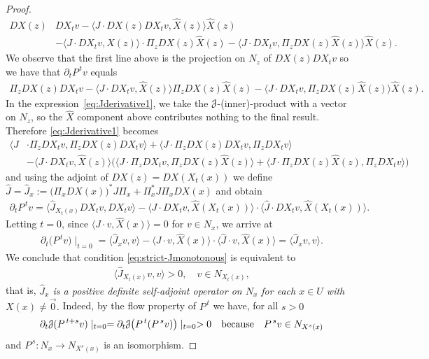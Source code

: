 \documentclass[12pt,reqno]{amsart}
\numberwithin{equation}{section}
\theoremstyle{plain}
\theoremstyle{definition}
\newcommand{\J}{\EuScript{J}}
\begin{document}
\begin{proof}
\begin{align*}
    DX(z)&DX_tv - \langle J \cdot DX(z)DX_tv, \hat
    X(z)\rangle \hat X(z)
    \\
    &- \langle J \cdot DX_tv, \hat X(z)\rangle \cdot
    \Pi_zDX(z)\hat X(z) - \langle J \cdot DX_tv,
    \Pi_zDX(z)\hat X(z) \rangle \hat X(z).
  \end{align*}
  We observe that the first line above is the projection on
  $N_z$ of $DX(z)DX_tv$ so we have that $\partial_tP^{\,
    t}v$ equals
  \begin{align*}
     \Pi_zDX(z)DX_tv - \langle J \cdot
    DX_tv, \hat X(z)\rangle \Pi_zDX(z)\hat X(z) - \langle J
    \cdot DX_tv, \Pi_zDX(z)\hat X(z) \rangle \hat X(z).
  \end{align*}
  In the expression~\eqref{eq:Jderivative1}, we take the
  $\J$-(inner)-product with a vector on $N_z$, so the $\hat
  X$ component above contributes nothing to the final
  result. Therefore \eqref{eq:Jderivative1} becomes
  \begin{align*}
    \langle J &\cdot \Pi_{z}DX_tv , \Pi_zDX(z)DX_tv \rangle
    + \langle J \cdot \Pi_zDX(z)DX_tv , \Pi_{z}DX_tv \rangle
    \\
    &-\langle J \cdot DX_tv, \hat X(z)\rangle \big( \langle
    J \cdot \Pi_{z}DX_tv , \Pi_zDX(z)\hat X(z) \rangle +
    \langle J \cdot \Pi_zDX(z)\hat X(z) , \Pi_{z}DX_tv
    \rangle \big)
  \end{align*}
  and using the adjoint of $DX(z)=DX(X_t(x))$ we define
  $\hat J = \hat J_x := \big(\Pi_x DX(x)\big)^* J \Pi_x +
  \Pi_x^* J \Pi_x DX(x)$ and obtain
  \begin{align*}
    \partial_tP^{\, t}v = \langle \hat J_{X_t(x)} DX_tv,
    DX_tv\rangle - \langle J \cdot DX_tv, \hat
    X(X_t(x))\rangle\cdot \langle \hat J \cdot DX_tv ,\hat
    X(X_t(x)) \rangle.
  \end{align*}
  Letting $t=0$, since $ \langle J \cdot v, \hat
  X(x)\rangle=0$ for $v\in N_x$, we arrive at
  \begin{align}
    \label{eq:LPF-J-derivative}
    \partial_t\big(P^{\, t}v\big)\mid_{t=0} = \langle \hat
    J_{x} v, v\rangle - \langle J \cdot v, \hat
    X(x)\rangle\cdot \langle \hat J \cdot v ,\hat X(x)
    \rangle = \langle \hat J_{x} v, v\rangle.
  \end{align}
  We conclude that condition \eqref{eq:strict-Jmonotonous}
  is equivalent to
  \begin{align}
    \label{eq:strict-J-monotonous-DX}
    \langle \hat J_{X_t(x)} v, v\rangle >0, \quad v\in
    N_{X_t(x)},
  \end{align}
  that is, \emph{$\hat J_x$ is a positive definite
    self-adjoint operator on $N_x$ for each $x\in U$ with
    $X(x)\neq\vec0$.}  Indeed, by the flow property of
  $P^{\,t}$ we have, for all $s>0$
  \begin{align*}
    \partial_t\J(P^{\,t+s}v)\mid_{t=0}=
    \partial_t\J\big(P^{\,t}(P^{\,s}v)\big)\mid_{t=0}>0
    \quad\text{because}\quad P^{\,s}v\in N_{X^s(x)}
  \end{align*}
  and $P^{\, s}:N_x\to N_{X^s(x)}$ is an isomorphism.
\end{proof}
\end{document}
